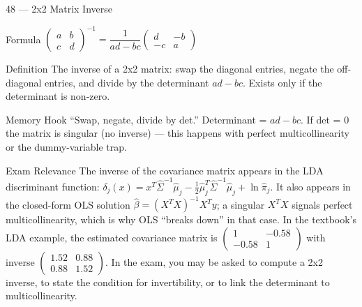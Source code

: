 \documentclass[aspectratio=169,8pt]{beamer}
\begin{document}
	\begin{frame}{48 --- 2x2 Matrix Inverse}
		\begin{block}{Formula}
			$\begin{pmatrix} a & b \\ c & d \end{pmatrix}^{-1} = \dfrac{1}{ad - bc}\begin{pmatrix} d & -b \\ -c & a \end{pmatrix}$
		\end{block}
		\begin{block}{Definition}
			The inverse of a 2x2 matrix: swap the diagonal entries, negate the off-diagonal entries, and divide by the determinant $ad - bc$. Exists only if the determinant is non-zero.
		\end{block}
		\begin{block}{Memory Hook}
			``Swap, negate, divide by det.'' Determinant = $ad - bc$. If det = 0 the matrix is singular (no inverse) --- this happens with perfect multicollinearity or the dummy-variable trap.
		\end{block}
		\begin{block}{Exam Relevance}
			The inverse of the covariance matrix appears in the LDA discriminant function: $\delta_j(x) = x^T\hat{\Sigma}^{-1}\hat{\mu}_j - \tfrac12\hat{\mu}_j^T\hat{\Sigma}^{-1}\hat{\mu}_j + \ln \hat{\pi}_j$. It also appears in the closed-form OLS solution $\hat{\beta} = (X^TX)^{-1}X^Ty$; a singular $X^TX$ signals perfect multicollinearity, which is why OLS ``breaks down'' in that case. In the textbook's LDA example, the estimated covariance matrix is $\begin{pmatrix}1 & -0.58\\ -0.58 & 1\end{pmatrix}$ with inverse $\begin{pmatrix}1.52 & 0.88\\ 0.88 & 1.52\end{pmatrix}$. In the exam, you may be asked to compute a 2x2 inverse, to state the condition for invertibility, or to link the determinant to multicollinearity.
		\end{block}
	\end{frame}
	
\end{document}
